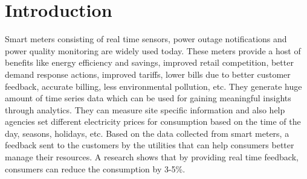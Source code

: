 \documentclass[conference]{IEEEtran}
\begin{document}
\begin{abstract}

\end{abstract}







%
\IEEEpeerreviewmaketitle



\section{Introduction}
Smart meters consisting of real time sensors, power outage notifications and power quality monitoring are widely used today. These meters provide a host of benefits like energy efficiency and savings, improved retail competition, better demand response actions, improved tariffs, lower bills due to better customer feedback, accurate billing, less environmental pollution, etc. \cite{Klopfert}
They generate huge amount of time series data which can be used for gaining meaningful insights through analytics.
They can measure site specific information and also help agencies set different electricity prices for consumption based on the time of the day, seasons, holidays, etc. Based on the data collected from smart meters, a feedback sent to the customers by the utilities that can help consumers better manage their resources. A research \cite{mckerracher} shows that by providing real time feedback, consumers can reduce the consumption by 3-5\%.
\end{document}
